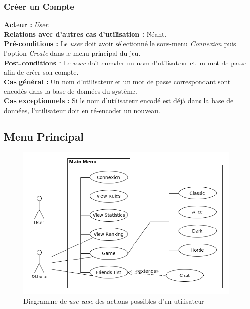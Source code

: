 \documentclass[10pt, a4paper]{article}
\begin{document}
\subsubsection{Créer un Compte}
\textbf{Acteur :} \textit{User}.\\
\textbf{Relations avec d'autres cas d'utilisation :} Néant.\\
\textbf{Pré-conditions :} Le \textit{user} doit avoir sélectionné le sous-menu \textit{Connexion} puis l'option {\itshape Create} dans le menu principal du jeu.\\
\textbf{Post-conditions :} Le \textit{user} doit encoder un nom d'utilisateur et un mot de passe afin de créer son compte.\\
\textbf{Cas général :} Un nom d'utilisateur et un mot de passe correspondant sont encodés dans la base de données du système.\\
\textbf{Cas exceptionnels :} Si le nom d'utilisateur encodé est déjà dans la base de données, l'utilisateur doit en ré-encoder un nouveau.



\subsection{Menu Principal}

\begin{figure}[ht]
\begin{center}
\includegraphics[scale=0.5]{UC_mainmenu.png}
\caption{Diagramme de \textit{use case} des actions possibles d'un utilisateur}
\label{UC_menu} %
\end{center}
\end{figure}
\end{document}
